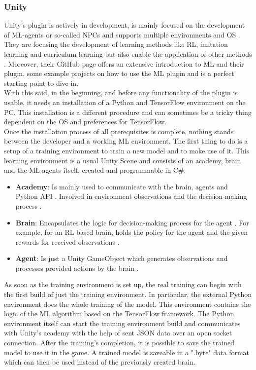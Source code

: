 \documentclass[MGS,Master,english]{twbook}%
\begin{document}
\subsubsection{Unity}
Unity's plugin is actively in development, is mainly focused on the development of ML-agents or so-called \ac{NPC}s and supports multiple environments and \ac{OS} \cite{unity::mlGithub}. They are focusing the development of learning methods like RL, imitation learning and curriculum learning but also enable the application of other methods \cite{unity::mlGithub}. Moreover, their GitHub page offers an extensive introduction to ML and their plugin, some example projects on how to use the ML plugin and is a perfect starting point to dive in. \\
With this said, in the beginning, and before any functionality of the plugin is usable, it needs an installation of a Python and TensorFlow environment on the PC. This installation is a different procedure and can sometimes be a tricky thing dependent on the \ac{OS} and preferences for TensorFlow.\\
Once the installation process of all prerequisites is complete, nothing stands between the developer and a working ML environment. The first thing to do is a setup of a training environment to train a new model and to make use of it. This learning environment is a usual Unity Scene and consists of an academy, brain and the ML-agents itself, created and programmable in C\#:
\begin{itemize}
	\item \textbf{Academy}: Is mainly used to communicate with the brain, agents and Python API \cite{unity::mlGithub}. Involved in environment observations and the decision-making process \cite{unity::mlGithub}. 
	\item \textbf{Brain}: Encapsulates the logic for decision-making process for the agent \cite{unity::mlGithub}. For example, for an RL based brain, holds the policy for the agent and the given rewards for received observations \cite{unity::mlGithub}.
	\item \textbf{Agent}: Is just a Unity GameObject which generates observations and processes provided actions by the brain \cite{unity::mlGithub}.
\end{itemize}  
As soon as the training environment is set up, the real training can begin with the first build of just the training environment. In particular, the external Python environment does the whole training of the model. This environment contains the logic of the ML algorithm based on the TensorFlow framework. The Python environment itself can start the training environment build and communicates with Unity’s academy with the help of sent \ac{JSON} data over an open socket connection. After the training's completion, it is possible to save the trained model to use it in the game. A trained model is saveable in a ".byte" data format which can then be used instead of the previously created brain.
\end{document}
